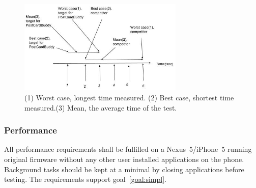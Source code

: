 \documentclass[10pt,a4paper]{article}
\begin{document}
\begin{figure}[h!]
\centering
\includegraphics[width=0.7\textwidth]{QUPER_v1.jpg}
\caption{ (1) Worst case, longest time measured. (2) Best case, shortest time measured.(3) Mean, the average time of the test. }
\label{fig:quper}
\end{figure}


\subsubsection{Performance}
All performance requirements shall be fulfilled on a Nexus~5/iPhone~5 running original firmware without any other user installed applications on the phone. Background tasks should be kept at a minimal by closing applications before testing. The requirements support goal~\ref{goal:simpl}.
\end{document}
